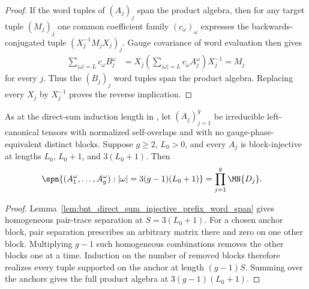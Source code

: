 \begin{proof}
    \leanok
    If the word tuples of $(A_j)_j$ span the product algebra, then for any
    target tuple $(M_j)_j$ one common coefficient family $(c_\omega)_\omega$
    expresses the backwards-conjugated tuple $(X_j^{-1}M_jX_j)_j$. Gauge
    covariance of word evaluation then gives
    \begin{align}
        \sum_{|\omega|=L}c_\omega B_j^\omega
         & =X_j\left(\sum_{|\omega|=L}c_\omega A_j^\omega\right)X_j^{-1}
        =M_j
    \end{align}
    for every $j$. Thus the $(B_j)_j$ word tuples span the product algebra.
    Replacing every $X_j$ by $X_j^{-1}$ proves the reverse implication.
\end{proof}

\begin{lemma}
    \label{lem:bnt_direct_sum_block_separation_word_span}
    \leanok
    As at the direct-sum induction length in
    \cite[lines~1346--1408]{PerezGarcia2007Matrix}, let $(A_j)_{j=1}^g$ be
    irreducible left-canonical tensors with normalized self-overlaps and with
    no gauge-phase-equivalent distinct blocks. Suppose $g\geq2$, $L_0>0$, and
    every $A_j$ is block-injective at lengths $L_0$, $L_0+1$, and $3(L_0+1)$.
    Then
    \begin{align}
        \spn\{(A_1^\omega,\ldots,A_g^\omega):
        |\omega|=3(g-1)(L_0+1)\}
         & =\prod_{j=1}^{g}\MN{D_j}.
        \notag
    \end{align}
\end{lemma}

\begin{proof}
    \leanok
    Lemma~\ref{lem:bnt_direct_sum_injective_prefix_word_span} gives homogeneous
    pair-trace separation at $S=3(L_0+1)$. For a chosen anchor block, pair
    separation prescribes an arbitrary matrix there and zero on one other
    block. Multiplying $g-1$ such homogeneous combinations removes the other
    blocks one at a time. Induction on the number of removed blocks therefore
    realizes every tuple supported on the anchor at length $(g-1)S$. Summing
    over the anchors gives the full product algebra at
    $3(g-1)(L_0+1)$.
\end{proof}

